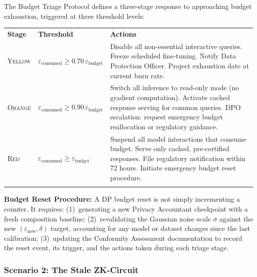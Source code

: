 \begin{tcolorbox}[debtpattern,
  title={Debt Management Pattern 1 --- Budget Triage Protocol}]

The Budget Triage Protocol defines a three-stage response to
approaching budget exhaustion, triggered at three threshold
levels:

\medskip
\begin{tabular}{@{}p{1.6cm} p{2.0cm} p{7.2cm}@{}}
\hline\noalign{\smallskip}
\textbf{Stage} & \textbf{Threshold} & \textbf{Actions} \\
\noalign{\smallskip}\svhline\noalign{\smallskip}
\textsc{Yellow}
  & $\varepsilon_{\mathrm{consumed}} \geq 0.70\,
    \varepsilon_{\mathrm{budget}}$
  & Disable all non-essential interactive queries.
    Freeze scheduled fine-tuning.
    Notify Data Protection Officer.
    Project exhaustion date at current burn rate. \\[4pt]
\textsc{Orange}
  & $\varepsilon_{\mathrm{consumed}} \geq 0.90\,
    \varepsilon_{\mathrm{budget}}$
  & Switch all inference to read-only mode
    (no gradient computation).
    Activate cached response serving for common queries.
    DPO escalation: request emergency budget reallocation
    or regulatory guidance. \\[4pt]
\textsc{Red}
  & $\varepsilon_{\mathrm{consumed}} \geq
    \varepsilon_{\mathrm{budget}}$
  & Suspend all model interactions that consume budget.
    Serve only cached, pre-certified responses.
    File regulatory notification within 72 hours.
    Initiate emergency budget reset procedure. \\
\noalign{\smallskip}\hline\noalign{\smallskip}
\end{tabular}

\medskip
\textbf{Budget Reset Procedure:}
A DP budget reset is not simply incrementing a counter.
It requires: (1)~generating a new Privacy Accountant checkpoint
with a fresh composition baseline; (2)~revalidating the
Gaussian noise scale $\sigma$ against the new
$(\varepsilon_{\mathrm{new}}, \delta)$ target, accounting for
any model or dataset changes since the last calibration;
(3)~updating the Conformity Assessment documentation to record
the reset event, its trigger, and the actions taken during
each triage stage.
\end{tcolorbox}

\subsubsection{Scenario 2: The Stale ZK-Circuit}
\label{subsubsec:scenario-zk-circuit}

